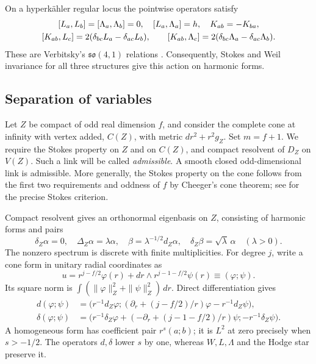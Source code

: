 On a hyperk\"ahler regular locus the pointwise operators satisfy
\begin{gather}\label{eq:verbitsky}
 [L_a,L_b]=[\Lambda_a,\Lambda_b]=0,\quad [L_a,\Lambda_a]=h,
 \quad K_{ab}=-K_{ba},\notag\\
 [K_{ab},L_c]=2(\delta_{bc}L_a-\delta_{ac}L_b),\qquad
 [K_{ab},\Lambda_c]=2(\delta_{bc}\Lambda_a-\delta_{ac}\Lambda_b).
\end{gather}
These are Verbitsky's $\mathfrak{so}(4,1)$ relations
\cite{verbitsky90,ll97}. Consequently, Stokes and Weil invariance
for all three structures give this action on harmonic forms.

\subsection{Separation of variables}
Let $Z$ be compact of odd real dimension $f$, and consider the
complete cone at infinity with vertex added,
$C(Z)$, with metric $dr^2+r^2g_Z$. Set $m=f+1$.
We require the Stokes property on $Z$ and on $C(Z)$, and compact
resolvent of $D_Z$ on $V(Z)$. Such a link will be called
\emph{admissible}. A smooth closed odd-dimensional link is
admissible. More generally, the Stokes property on the cone follows
from the first two requirements and oddness of $f$ by Cheeger's
cone theorem; see \cite[\S2]{gl02} for the precise Stokes criterion.

Compact resolvent gives an orthonormal eigenbasis on $Z$, consisting
of harmonic forms and pairs
\[
 \delta_Z\alpha=0,\quad \Delta_Z\alpha=\lambda\alpha,
 \quad \beta=\lambda^{-1/2}d_Z\alpha,
 \quad \delta_Z\beta=\sqrt\lambda\,\alpha\quad(\lambda>0).
\]
The nonzero spectrum is discrete with finite multiplicities.
For degree $j$, write a cone form in unitary radial coordinates as
\[
 u=r^{j-f/2}\varphi(r)+dr\wedge r^{j-1-f/2}\psi(r)
 \equiv(\varphi;\psi).
\]
Its square norm is $\int(\|\varphi\|_Z^2+\|\psi\|_Z^2)\,dr$.
Direct differentiation gives
\begin{align}
 d(\varphi;\psi)&=\big(r^{-1}d_Z\varphi;
 (\partial_r+(j-f/2)/r)\varphi-r^{-1}d_Z\psi\big),\label{eq:d-cone}\\
 \delta(\varphi;\psi)&=\big(r^{-1}\delta_Z\varphi+
 (-\partial_r+(j-1-f/2)/r)\psi;-r^{-1}\delta_Z\psi\big).
 \label{eq:delta-cone}
\end{align}
A homogeneous form has coefficient pair $r^s(a;b)$; it is $L^2$
at zero precisely when $s>-1/2$. The operators $d,\delta$ lower
$s$ by one, whereas $W,L,\Lambda$ and the Hodge star preserve it.


